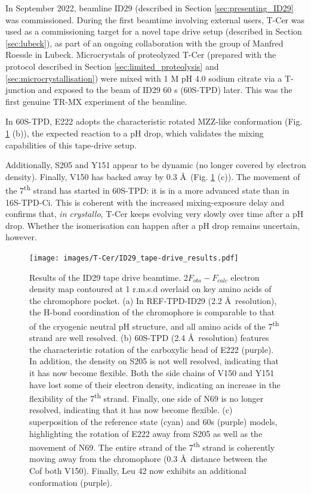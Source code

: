 In September 2022, beamline ID29 (described in Section \ref{sec:presenting_ID29} was commissioned. During the first beamtime involving external users, T-Cer was used as a commissioning target for a novel tape drive setup (described in Section \ref{sec:lubeck}), as part of an ongoing collaboration with the group of Manfred Roessle in Lubeck. Microcrystals of proteolyzed T-Cer (prepared with the protocol described in Section \ref{sec:limited_proteolysis} and \ref{sec:microcrystallisation}) were mixed with 1 M pH 4.0 sodium citrate via a T-junction and exposed to the beam of ID29 60 s (60S-TPD) later. This was the first genuine TR-MX experiment of the beamline.

In 60S-TPD, E222 adopts the characteristic rotated MZZ-like conformation (Fig. \ref{fig:ID29_results} (b)), the expected reaction to a pH drop, which validates the mixing capabilities of this tape-drive setup. 

\vspace{2mm}

Additionally, S205 and Y151 appear to be dynamic (no longer covered by electron density). Finally, V150 has backed away by 0.3 \AA\ (Fig. \ref{fig:ID29_results} (c)). The movement of the 7\textsuperscript{th} strand has started in 60S-TPD: it is in a more advanced state than in 16S-TPD-Ci. This is coherent with the increased mixing-exposure delay and confirms that, \textit{in crystallo}, T-Cer keeps evolving very slowly over time after a pH drop. 
Whether the isomerisation can happen after a pH drop remains uncertain, however.
\begin{figure}[H] 
    \centering
        \noindent \texttt{[image: images/T-Cer/ID29\_tape-drive\_results.pdf]}
    \caption{Results of the ID29 tape drive beamtime. 2\(F_{obs} - F_{calc}\) electron density map contoured at 1 r.m.s.d overlaid on key amino acids of the chromophore pocket. (a) In REF-TPD-ID29 (2.2 \AA\ resolution), the H-bond coordination of the chromophore is comparable to that of the cryogenic neutral pH structure, and all amino acids of the 7\textsuperscript{th} strand are well resolved. (b) 60S-TPD (2.4 \AA\ resolution) features the characteristic rotation of the carboxylic head of E222 (purple). In addition, the density on S205 is not well resolved, indicating that it has now become flexible. Both the side chains of V150 and Y151 have lost some of their electron density, indicating an increase in the flexibility of the 7\textsuperscript{th} strand. Finally, one side of N69 is no longer resolved, indicating that it has now become flexible. (c) superposition of the reference state (cyan) and 60s (purple) models, highlighting the rotation of E222 away from S205 as well as the movement of N69. The entire strand of the 7\textsuperscript{th} strand is coherently moving away from the chromophore (0.3 \AA\ distance between the C\textalpha of both V150). Finally, Leu 42 now exhibits an additional conformation (purple).}\label{fig:ID29_results}
\end{figure}

